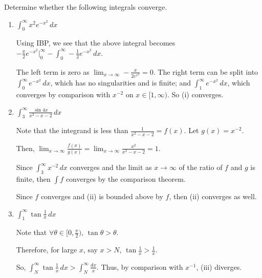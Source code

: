 \documentclass{subfiles}
\begin{document}
\begin{problem}[1]
Determine whether the following integrals converge.
\begin{enumerate}[label=\roman*)]
	\item $\int_{0}^{\infty} x^2e^{-x^2} \,dx$

	      Using IBP, we see that the above integral becomes $-\frac{x}{2}e^{-x^2}\big\vert_0^{\infty}-\int_{0}^{\infty} -\frac{1}{2}e^{-x^2} \,dx$.

	      The left term is zero as $\lim_{x \to \infty} -\frac{x}{2e^{x^2}}=0$.
	      The right term can be split into $\int_{0}^{\infty} e^{-x^2} \,dx$, which has no singularities and is finite;
	      and $\int_{1}^{\infty} e^{-x^2} \,dx$, which converges by comparison with $x^{-2}$ on $x\in [1,\infty)$.
	      So (i) converges.
	\item $\int_{3}^{\infty} \frac{\sin{4x}}{x^2-x-2} \,dx$

	      Note that the integrand is less than $\frac{1}{x^2-x-2} = f(x)$.
	      Let $g(x)=x^{-2}$.

	      Then, $\lim_{x \to \infty} \frac{f(x)}{g(x)}=\lim_{x \to \infty} \frac{x^2}{x^2-x-2} = 1$.

	      Since $\int_{3}^{\infty} x^{-2} \,dx$ converges and the limit as $x\to \infty$ of the ratio of $f$ and $g$ is finite, then  $\int f$ converges by the comparison theorem.

	      Since $f$ converges and (ii) is bounded above by $f$, then (ii) converges as well.

	\item $\int_{1}^{\infty} \tan{\frac{1}{x}} \,dx$

	      Note that $\forall \theta\in [0,\frac{\pi}{2} ),\, \tan\theta>\theta$.

	      Therefore, for large $x$, say $x>N$, $\tan{\frac{1}{x}}>\frac{1}{x}$.

	      So, $\int_{N}^{\infty} \tan{\frac{1}{x}} \,dx > \int_{N}^{\infty} \frac{dx}{x}$.
	      Thus, by comparison with $x^{-1}$, (iii) diverges.
\end{enumerate}
\end{problem}
\end{document}
